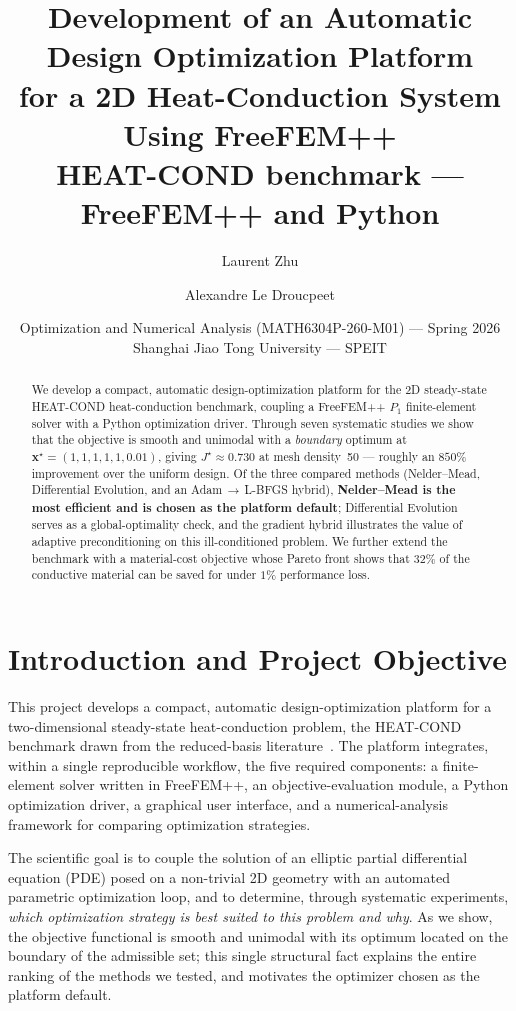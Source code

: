 \documentclass[11pt,a4paper]{article}
\title{%
\textbf{Development of an Automatic Design Optimization Platform\\
for a 2D Heat-Conduction System Using FreeFEM++}\\[4pt]
\large HEAT-COND benchmark --- FreeFEM++ and Python}
\author{Laurent Zhu \and Alexandre Le Droucpeet}
\date{Optimization and Numerical Analysis (MATH6304P-260-M01) --- Spring 2026\\
Shanghai Jiao Tong University --- SPEIT}
\begin{document}
\maketitle

\begin{abstract}
\noindent We develop a compact, automatic design-optimization platform for the 2D
steady-state HEAT-COND heat-conduction benchmark, coupling a FreeFEM++ $P_1$ finite-element
solver with a Python optimization driver. Through seven systematic studies we show that the
objective is smooth and unimodal with a \emph{boundary} optimum at
$\mathbf{x}^\star=(1,1,1,1,1,0.01)$, giving $J^\star\approx0.730$ at mesh density~50 ---
roughly an $850\%$ improvement over the uniform design. Of the three compared methods
(Nelder--Mead, Differential Evolution, and an Adam\,$\rightarrow$\,L-BFGS hybrid),
\textbf{Nelder--Mead is the most efficient and is chosen as the platform default}; Differential
Evolution serves as a global-optimality check, and the gradient hybrid illustrates the value
of adaptive preconditioning on this ill-conditioned problem. We further extend the benchmark with
a material-cost objective whose Pareto front shows that $32\%$ of the conductive material can be
saved for under $1\%$ performance loss.
\end{abstract}

\section{Introduction and Project Objective}
This project develops a compact, automatic design-optimization platform for a two-dimensional
steady-state heat-conduction problem, the HEAT-COND benchmark drawn from the reduced-basis
literature~\cite{ballout2024}. The platform integrates, within a single reproducible workflow,
the five required components: a finite-element solver written in FreeFEM++, an objective-evaluation
module, a Python optimization driver, a graphical user interface, and a numerical-analysis
framework for comparing optimization strategies.

The scientific goal is to couple the solution of an elliptic partial differential equation (PDE)
posed on a non-trivial 2D geometry with an automated parametric optimization loop, and to
determine, through systematic experiments, \emph{which optimization strategy is best suited to
this problem and why}. As we show, the objective functional is smooth and unimodal with its
optimum located on the boundary of the admissible set; this single structural fact explains the
entire ranking of the methods we tested, and motivates the optimizer chosen as the platform
default.
\end{document}
